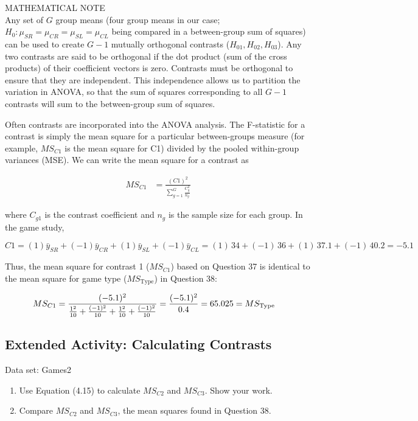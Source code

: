 \documentclass[
]{report}
\providecommand{\tightlist}{%
  \setlength{\itemsep}{0pt}\setlength{\parskip}{0pt}}
\theoremstyle{definition}
\theoremstyle{definition}
\theoremstyle{definition}
\theoremstyle{definition}
\theoremstyle{remark}
\begin{document}
MATHEMATICAL NOTE\\
Any set of \(G\) group means (four group means in our case; \(H_0: \mu_{SR} = \mu_{CR} = \mu_{SL} = \mu_{CL}\) being compared in a between-group sum of squares) can be used to create \(G - 1\) mutually orthogonal contrasts (\(H_{01}, H_{02}, H_{03}\)). Any two contrasts are said to be orthogonal if the dot product (sum of the cross products) of their coefficient vectors is zero. Contrasts must be orthogonal to ensure that they are independent. This independence allows us to partition the variation in ANOVA, so that the sum of squares corresponding to all \(G - 1\) contrasts will sum to the between-group sum of squares.

Often contrasts are incorporated into the ANOVA analysis. The F-statistic for a contrast is simply the mean square for a particular between-groups measure (for example, \(MS_{C1}\) is the mean square for C1) divided by the pooled within-group variances (MSE). We can write the mean square for a contrast as

\begin{align}
MS_{C1}
  &= \frac{(C1)^2}{\sum_{g=1}^G \frac{C_g^2}{n_g}}
  \tag{4.15}
\end{align}

where \(C_{g1}\) is the contrast coefficient and \(n_g\) is the sample size for each group. In the game study,

\[
C1 = (1)\bar y_{SR} + (-1)\bar y_{CR} + (1)\bar y_{SL} + (-1)\bar y_{CL}
   = (1)\,34 + (-1)\,36 + (1)\,37.1 + (-1)\,40.2
   = -5.1
\]

Thus, the mean square for contrast 1 (\(MS_{C1}\)) based on Question 37 is identical to the mean square for game type (\(MS_{\text{Type}}\)) in Question 38:

\begin{align}
MS_{C1}
  &= \frac{(-5.1)^2}{\frac{1^2}{10} + \frac{(-1)^2}{10} + \frac{1^2}{10} + \frac{(-1)^2}{10}}
  = \frac{(-5.1)^2}{0.4}
  = 65.025 
  = MS_{\text{Type}} \notag
\end{align}

\hypertarget{extended-activity-calculating-contrasts}{%
\subsection{Extended Activity: Calculating Contrasts}\label{extended-activity-calculating-contrasts}}

Data set: Games2

\begin{enumerate}
\def\labelenumi{\arabic{enumi}.}
\setcounter{enumi}{39}
\tightlist
\item
  Use Equation (4.15) to calculate \(MS_{C2}\) and \(MS_{C3}\). Show your work.\\
\item
  Compare \(MS_{C2}\) and \(MS_{C3}\), the mean squares found in Question 38.
\end{enumerate}
\end{document}
